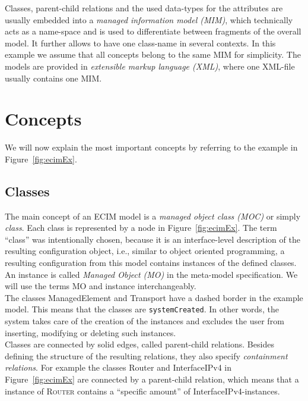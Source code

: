 Classes, parent-child relations and the used data-types for the attributes are usually embedded into a \emph{managed information model (MIM)}, which technically acts as a name-space and is used to differentiate between fragments of the overall model. It further allows to have one class-name in several contexts. In this example we assume that all concepts belong to the same MIM for simplicity. 
The models are provided in \emph{extensible markup language (XML)}, where one XML-file usually contains one MIM.\\

\section{Concepts}\label{sec:concepts}

We will now explain the most important concepts by referring to the example in Figure~\ref{fig:ecimEx}.


\subsection{Classes}\label{subsec:classes}

The main concept of an ECIM model is a \emph{managed object class (MOC)} or simply \emph{class}. Each class is represented by a node in Figure~\ref{fig:ecimEx}. The term ``class'' was intentionally chosen, because it is an interface-level description of the resulting configuration object, i.e., similar to object oriented programming, a resulting configuration from this model contains instances of the defined classes. An instance is called \emph{Managed Object (MO)} in the meta-model specification. We will use the terms MO and instance interchangeably.\\

The classes \textsf{ManagedElement} and \textsf{Transport} have a dashed border in the example model. This means that the classes are \verb|systemCreated|. In other words, the system takes care of the creation of the instances and excludes the user from inserting, modifying or deleting such instances. \\

Classes are connected by solid edges, called parent-child relations. Besides defining the structure of the resulting relations, they also specify \emph{containment relations}. For example the classes \textsf{Router} and \textsf{InterfaceIPv4} in Figure~\ref{fig:ecimEx} are connected by a parent-child relation, which means that a instance of \textsc{Router} contains a ``specific amount'' of \textsf{InterfaceIPv4}-instances.


